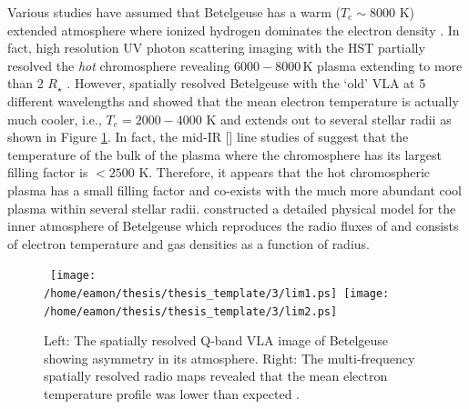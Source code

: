 Various studies have assumed that Betelgeuse has a warm ($T_e \sim 8000$ K) extended atmosphere where ionized hydrogen dominates the electron density \citep[e.g.,][]{newell_1982,hartmann_1984}. In fact, high resolution UV photon scattering imaging with the HST partially resolved the \textit{hot} chromosphere revealing $6000-8000$\,K plasma extending to more than 2 $R_{\star}$ \citep{gilliland_1996}. However, \cite{lim_1998} spatially resolved Betelgeuse with the `old' VLA at 5 different wavelengths and showed that the mean electron temperature is actually much cooler, i.e., $T_e = 2000 - 4000$ K and extends out to several stellar radii as shown in Figure \ref{fig3.1}. In fact, the mid-IR [] line studies of \cite{harper_2009} suggest that the temperature of the bulk of the plasma where the chromosphere has its largest filling factor is $< 2500$ K. Therefore, it appears that the hot chromospheric plasma has a small filling factor and co-exists with the much more abundant cool plasma within several stellar radii. \cite{harper_2001} constructed a detailed physical model for the inner atmosphere of Betelgeuse which reproduces the radio fluxes of \cite{lim_1998} and consists of electron temperature and gas densities as a function of radius.

\begin{figure}[hbt!]
\centering 
\mbox{
          \texttt{[image: /home/eamon/thesis/thesis\_template/3/lim1.ps]}
          \texttt{[image: /home/eamon/thesis/thesis\_template/3/lim2.ps]}
          }
\caption[VLA spatially resolved analysis of Betelgeuse.]{Left: The spatially resolved Q-band VLA image of Betelgeuse showing asymmetry in its atmosphere. Right: The multi-frequency spatially resolved radio maps revealed that the mean electron temperature profile was lower than expected \citep{lim_1998}.}
\label{fig3.1}
\end{figure}

